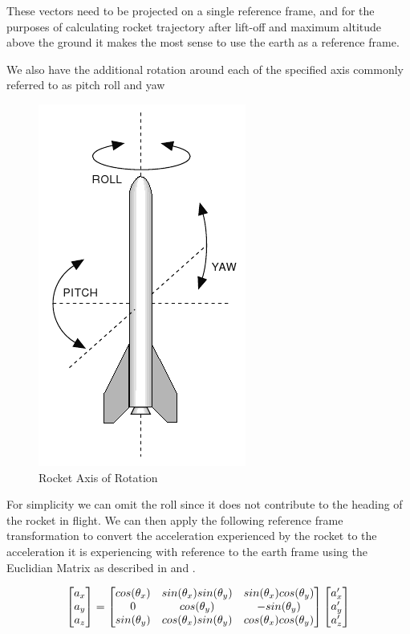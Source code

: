 \documentclass[conference, letterpaper]{IEEEtran}
\begin{document}
These vectors need to be projected on a single reference frame, and for the purposes of calculating
rocket trajectory after lift-off and maximum altitude above the ground it makes the most sense to
use the earth as a reference frame.

We also have the additional rotation around each of the specified axis commonly referred to as
pitch roll and yaw

\begin{figure}[H]
\centering
\includegraphics[scale=0.50]{./pitch_roll_yaw}
\caption{Rocket Axis of Rotation}
\label{fig:pitch_roll_yaw}
\end{figure}

For simplicity we can omit the roll since it does not contribute to the heading of the rocket in flight.
We can then apply the following reference frame transformation to convert the acceleration experienced
by the rocket to the acceleration it is experiencing with reference to the earth frame using the Euclidian Matrix
as described in \citep{mallick_2016} and \citep{whitmore}.
\vspace{5mm}

\begin{equation}\label{eq:2}
  \begin{bmatrix}a_x \\ a_y \\ a_z
  \end{bmatrix} =

  \vspace{5mm}
  \begin{bmatrix}
    cos(\theta_x) & sin(\theta_x)sin(\theta_y) & sin(\theta_x)cos(\theta_y) \\
    0 & cos(\theta_y) & -sin(\theta_y) \\
    sin(\theta_y) & cos(\theta_x)sin(\theta_y) & cos(\theta_x)cos(\theta_y) \\
  \end{bmatrix}
  \begin{bmatrix} a'_x \\ a'_y \\ a'_z \end{bmatrix}
\end{equation}
\end{document}
